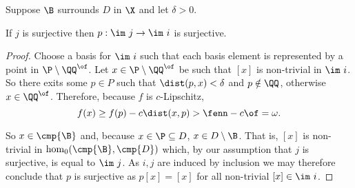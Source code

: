 \begin{lemma}\label{lem:psurj}
  Suppose $\B$ surrounds $D$ in $\X$ and let $\delta > 0$.

  If $j$ is surjective then $p : \im~j\to\im~i$ is surjective.
\end{lemma}
\begin{proof}
  Choose a basis for $\im~i$ such that each basis element is represented by a point in $\P\setminus \QQ^\of$.
  Let $x\in \P\setminus \QQ^\of$ be such that $[x]$ is non-trivial in $\im~i$.
  So there exits some $p\in P$ such that $\dist(p, x) < \delta$ and $p\notin \QQ$, otherwise $x\in\QQ^\of$.
  Therefore, because $f$ is $c$-Lipschitz,
  \[ f(x)\geq f(p) - c\dist(x, p) > \fenn - c\of =\omega.\]

  So $x\in\cmp{\B}$ and, because $x\in \P\subseteq D$, $x\in D\setminus \B$.
  That is, $[x]$ is non-trivial in $\hom_0(\cmp{\B},\cmp{D})$ which, by our assumption that $j$ is surjective, is equal to $\im~j$.
  As $i, j$ are induced by inclusion we may therefore conclude that $p$ is surjective as $p[x] = [x]$ for all non-trivial $[x]\in\im~i$.

\end{proof}

